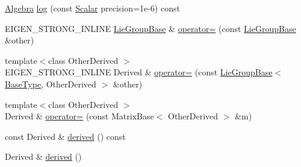 \begin{DoxyCompactItemize}
\item 
\hyperlink{class_lie_group_base_3_01_quaternion_3_01typename_01internal_1_1traits_3_01_derived_01_4_1_1_scalar_01_4_00_01_derived_01_4_a0a25a28e133c962ab8524a766ae6a01c}{Algebra} \hyperlink{class_lie_group_base_3_01_quaternion_3_01typename_01internal_1_1traits_3_01_derived_01_4_1_1_scalar_01_4_00_01_derived_01_4_a4f20af272eaf98644cb39a3f8976f75d}{log} (const \hyperlink{class_lie_group_base_3_01_quaternion_3_01typename_01internal_1_1traits_3_01_derived_01_4_1_1_scalar_01_4_00_01_derived_01_4_afadeceb3b98e52deecc572e71efb82a8}{Scalar} precision=1e-\/6) const
\item 
E\+I\+G\+E\+N\+\_\+\+S\+T\+R\+O\+N\+G\+\_\+\+I\+N\+L\+I\+NE \hyperlink{class_lie_group_base}{Lie\+Group\+Base} \& \hyperlink{class_lie_group_base_3_01_quaternion_3_01typename_01internal_1_1traits_3_01_derived_01_4_1_1_scalar_01_4_00_01_derived_01_4_a7dca1ee83a331d3743ca3f66b187528f}{operator=} (const \hyperlink{class_lie_group_base}{Lie\+Group\+Base} \&other)
\item 
{\footnotesize template$<$class Other\+Derived $>$ }\\E\+I\+G\+E\+N\+\_\+\+S\+T\+R\+O\+N\+G\+\_\+\+I\+N\+L\+I\+NE Derived \& \hyperlink{class_lie_group_base_3_01_quaternion_3_01typename_01internal_1_1traits_3_01_derived_01_4_1_1_scalar_01_4_00_01_derived_01_4_ab539e1018951e99410e0e9d417f9ccbf}{operator=} (const \hyperlink{class_lie_group_base}{Lie\+Group\+Base}$<$ \hyperlink{class_lie_group_base_3_01_quaternion_3_01typename_01internal_1_1traits_3_01_derived_01_4_1_1_scalar_01_4_00_01_derived_01_4_a1a65624391a6a8eb63eb312f919c4855}{Base\+Type}, Other\+Derived $>$ \&other)
\item 
{\footnotesize template$<$class Other\+Derived $>$ }\\Derived \& \hyperlink{class_lie_group_base_3_01_quaternion_3_01typename_01internal_1_1traits_3_01_derived_01_4_1_1_scalar_01_4_00_01_derived_01_4_a24e2a92feb274bd5ef0fa335522ee577}{operator=} (const Matrix\+Base$<$ Other\+Derived $>$ \&m)
\item 
const Derived \& \hyperlink{class_lie_group_base_3_01_quaternion_3_01typename_01internal_1_1traits_3_01_derived_01_4_1_1_scalar_01_4_00_01_derived_01_4_a33dfaeaa11703c5e38110751c3b09e84}{derived} () const
\item 
Derived \& \hyperlink{class_lie_group_base_3_01_quaternion_3_01typename_01internal_1_1traits_3_01_derived_01_4_1_1_scalar_01_4_00_01_derived_01_4_a89ce3b0eabd2df27d6e0f138559cab2d}{derived} ()
\item 

\end{DoxyCompactItemize}

